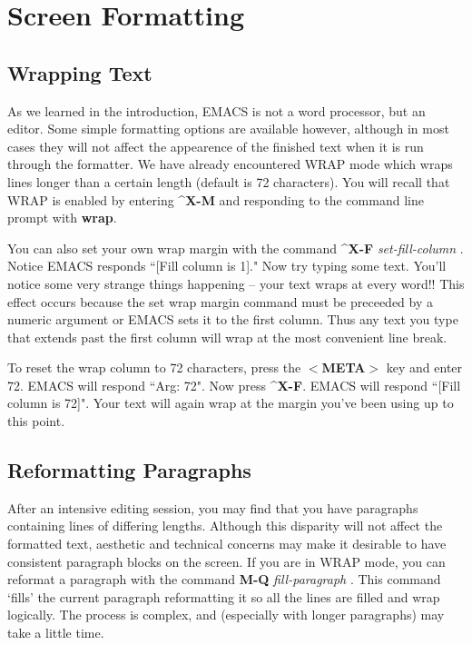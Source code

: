 \chapter{Screen Formatting}

\section{Wrapping Text}

As we learned in the introduction, EMACS is not a word processor, but an
editor.  Some simple formatting options are available however, although
in most cases they will not affect the appearence of the finished text
 when it is run through the formatter.  We have
already encountered WRAP mode which wraps lines longer than a certain
length (default is 72 characters).  You will recall that WRAP is enabled
by entering {\bf{}\^{}X-M} and responding to the command line prompt with
{\bf{}wrap}.

You can also set your own wrap margin with the command {\bf{}\^{}X-F}
{\it{}set-fill-column} .  Notice EMACS responds
``[Fill column is 1]." Now try typing some text.  You'll notice some very
strange things happening -- your text wraps at every word!! This effect
occurs because the set wrap margin command must be preceeded by a
numeric argument or EMACS sets it to the first column.  Thus any text
you type that extends past the first column will wrap at the most
convenient line break.

To reset the wrap column to 72 characters, press the
{\bf{}$<${}META$>${}} key and enter 72.  EMACS will respond ``Arg:
72".  Now press {\bf\^{}X-F}.  EMACS will respond ``[Fill column is
72]".  Your text will again wrap at the margin you've been using up to
this point.

\section{Reformatting Paragraphs}

After an intensive editing session, you may find that you have
paragraphs containing lines of differing lengths.  Although this
disparity will not affect the formatted text, aesthetic and technical
concerns may make it desirable to have consistent paragraph blocks on
the screen.  If you are in WRAP mode, you can reformat a paragraph with
the command {\bf{}M-Q} {\it{}fill-paragraph} .  This
command `fills' the current paragraph reformatting it so all the lines
are filled and wrap logically.  The process is complex, and (especially
with longer paragraphs) may take a little time.

